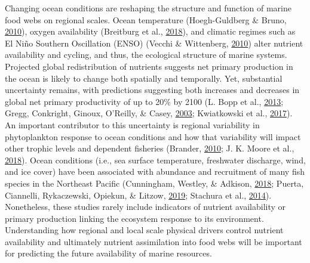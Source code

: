 \documentclass [11pt, proquest] {uwthesis}[2015/03/03]
\begin{document}
Changing ocean conditions are reshaping the structure and function of
marine food webs on regional scales. Ocean temperature (Hoegh-Guldberg
\& Bruno, \protect\hyperlink{ref-Hoegh2010}{2010}), oxygen availability
(Breitburg et al., \protect\hyperlink{ref-Brietburg2018}{2018}), and
climatic regimes such as El Niño Southern Oscillation (ENSO) (Vecchi \&
Wittenberg, \protect\hyperlink{ref-Vecchi2010}{2010}) alter nutrient
availability and cycling, and thus, the ecological structure of marine
systems. Projected global redistribution of nutrients suggests net
primary production in the ocean is likely to change both spatially and
temporally. Yet, substantial uncertainty remains, with predictions
suggesting both increases and decreases in global net primary
productivity of up to 20\% by 2100 (L. Bopp et al.,
\protect\hyperlink{ref-Bopp2013}{2013}; Gregg, Conkright, Ginoux,
O'Reilly, \& Casey, \protect\hyperlink{ref-Gregg2003}{2003}; Kwiatkowski
et al., \protect\hyperlink{ref-Kwiatkowski2017}{2017}). An important
contributor to this uncertainty is regional variability in phytoplankton
response to ocean conditions and how that variability will impact other
trophic levels and dependent fisheries (Brander,
\protect\hyperlink{ref-Brander2010}{2010}; J. K. Moore et al.,
\protect\hyperlink{ref-Moore2018}{2018}). Ocean conditions (i.e., sea
surface temperature, freshwater discharge, wind, and ice cover) have
been associated with abundance and recruitment of many fish species in
the Northeast Pacific (Cunningham, Westley, \& Adkison,
\protect\hyperlink{ref-Cunningham2018}{2018}; Puerta, Ciannelli,
Rykaczewski, Opiekun, \& Litzow,
\protect\hyperlink{ref-Puerta2019}{2019}; Stachura et al.,
\protect\hyperlink{ref-Stachura2014}{2014}). Nonetheless, these studies
rarely include indicators of nutrient availability or primary production
linking the ecosystem response to its environment. Understanding how
regional and local scale physical drivers control nutrient availability
and ultimately nutrient assimilation into food webs will be important
for predicting the future availability of marine resources.
\end{document}
